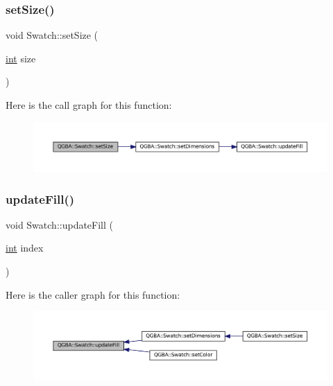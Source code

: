 \subsubsection{\texorpdfstring{set\+Size()}{setSize()}}
{\footnotesize\ttfamily void Swatch\+::set\+Size (\begin{DoxyParamCaption}\item[{\mbox{\hyperlink{ioapi_8h_a787fa3cf048117ba7123753c1e74fcd6}{int}}}]{size }\end{DoxyParamCaption})}

Here is the call graph for this function\+:
\nopagebreak
\begin{figure}[H]
\begin{center}
\leavevmode
\includegraphics[width=350pt]{class_q_g_b_a_1_1_swatch_a2de15472f12d992a5462e188497453b2_cgraph}
\end{center}
\end{figure}
\mbox{\label{class_q_g_b_a_1_1_swatch_abaae45bdb263ea64d78e525f3cbb72e5}} 
\subsubsection{\texorpdfstring{update\+Fill()}{updateFill()}}
{\footnotesize\ttfamily void Swatch\+::update\+Fill (\begin{DoxyParamCaption}\item[{\mbox{\hyperlink{ioapi_8h_a787fa3cf048117ba7123753c1e74fcd6}{int}}}]{index }\end{DoxyParamCaption})\hspace{0.3cm}{\ttfamily [private]}}

Here is the caller graph for this function\+:
\nopagebreak
\begin{figure}[H]
\begin{center}
\leavevmode
\includegraphics[width=350pt]{class_q_g_b_a_1_1_swatch_abaae45bdb263ea64d78e525f3cbb72e5_icgraph}
\end{center}
\end{figure}


